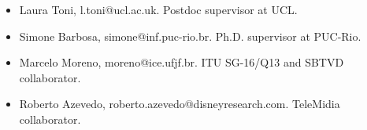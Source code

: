 \documentclass[10pt,a4paper,sans,colorlinks]{moderncv}
\begin{document}
\begin{itemize}
    \item Laura Toni, l.toni@ucl.ac.uk. Postdoc supervisor at UCL.
    \item Simone Barbosa, simone@inf.puc-rio.br. Ph.D. supervisor at PUC-Rio.
    \item Marcelo Moreno, moreno@ice.ufjf.br. ITU SG-16/Q13 and SBTVD collaborator. 
    \item Roberto Azevedo, roberto.azevedo@disneyresearch.com. TeleMidia collaborator.
\end{itemize}
\end{document}
